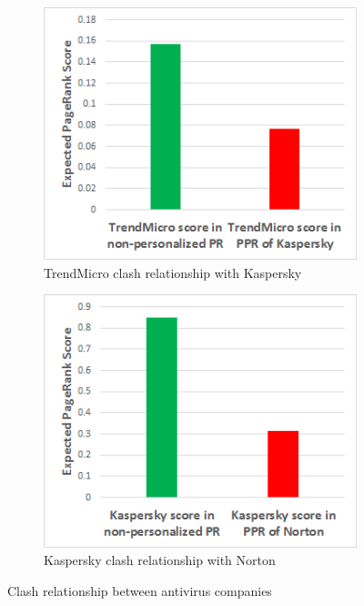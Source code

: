 \documentclass[ijoc,nonblindrev]{informs3} %
\numberwithin{equation}{subsection}
\begin{document}
\begin{figure}[!htbp]
\centering
\begin{subfigure}[b]{0.4\textwidth}
	\centering
\includegraphics[width=\textwidth]{figures/trend_clash_kaspersky1.png}
\caption{TrendMicro clash relationship with Kaspersky}
\label{fig:trend_clash_kaspersky}
\end{subfigure}
\begin{subfigure}[b]{0.4\textwidth}
	\centering
\includegraphics[width=\textwidth]{figures/kaspersky_clash_norton1.png}
\caption{Kaspersky clash relationship with Norton}
\label{fig:kaspersky_clash_norton}
\end{subfigure}
\caption{Clash relationship between antivirus companies}
	\label{fig:clash_av}
\end{figure}
\end{document}
